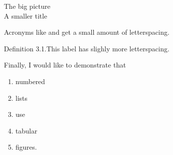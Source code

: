 \documentclass{scrartcl}
\begin{document}
\begin{center}
  {\allcaps The big picture}\\
  {\sctitle A smaller title}
\end{center}

Acronyms like  and  get a small amount of letterspacing.

{\sclabel Definition 3.1.}\enskip This label has slighly more letterspacing.

Finally, I would like to demonstrate that
\begin{enumerate}[nosep]
\item numbered
\item lists
\item use
\item tabular
\item figures.
\end{enumerate}
\end{document}
